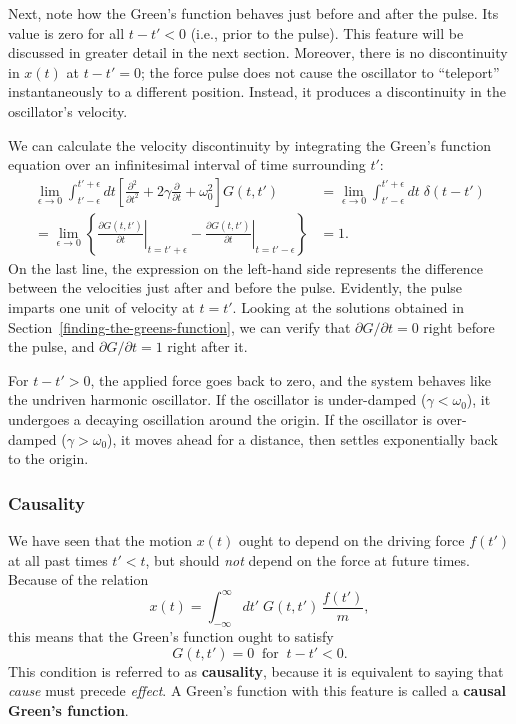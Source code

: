 \documentclass[10pt,a4paper]{article}
\begin{document}
Next, note how the Green's function behaves just before and after the
pulse. Its value is zero for all $t - t' < 0$ (i.e., prior to the
pulse). This feature will be discussed in greater detail in the next
section. Moreover, there is no discontinuity in $x(t)$ at $t - t' =
0$; the force pulse does not cause the oscillator to ``teleport''
instantaneously to a different position.  Instead, it produces a
discontinuity in the oscillator's velocity.

We can calculate the velocity discontinuity by integrating the Green's
function equation over an infinitesimal interval of time surrounding
$t'$:
\begin{align}
  \lim_{\epsilon \rightarrow 0} \int_{t'-\epsilon}^{t'+\epsilon} dt \left[\frac{\partial^2}{\partial t^2} + 2\gamma\frac{\partial}{\partial t} + \omega_0^2\right] G(t,t') &= \lim_{\epsilon \rightarrow 0} \int_{t'-\epsilon}^{t'+\epsilon} dt \; \delta(t-t') \\
  = \lim_{\epsilon \rightarrow 0} \left\{ \left.\frac{\partial G(t,t')}{\partial t}\right|_{t = t' +\epsilon} - \left.\frac{\partial G(t,t')}{\partial t}\right|_{t = t' - \epsilon}\right\} &= 1.
\end{align}
On the last line, the expression on the left-hand side represents the
difference between the velocities just after and before the
pulse. Evidently, the pulse imparts one unit of velocity at
$t=t'$. Looking at the solutions obtained in
Section~\ref{finding-the-greens-function}, we can verify that
$\partial G/\partial t = 0$ right before the pulse, and $\partial
G/\partial t = 1$ right after it.

For $t - t' > 0$, the applied force goes back to zero, and the system
behaves like the undriven harmonic oscillator. If the oscillator is
under-damped ($\gamma < \omega_0$), it undergoes a decaying
oscillation around the origin. If the oscillator is over-damped
($\gamma > \omega_0$), it moves ahead for a distance, then settles
exponentially back to the origin.

\subsubsection{Causality}
\label{causality}

We have seen that the motion $x(t)$ ought to depend on the driving
force $f(t')$ at all past times $t' < t$, but should \emph{not} depend
on the force at future times. Because of the relation
\begin{equation}
x(t) = \int_{-\infty}^\infty dt'\; G(t,t')\, \frac{f(t')}{m},
\end{equation}
this means that the Green's function ought to satisfy
\begin{equation}
G(t,t') = 0 \;\; \mathrm{for}\;\; t -t' < 0.
\end{equation}
This condition is referred to as \textbf{causality}, because it is
equivalent to saying that \emph{cause} must precede \emph{effect}. A
Green's function with this feature is called a \textbf{causal Green's
  function}.
\end{document}
